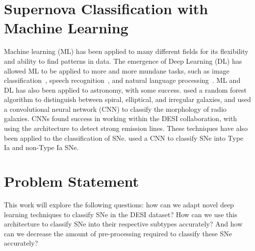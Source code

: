 \section{Supernova Classification with Machine Learning}
\label{sec:supernova-classification-with-machine-learning}
Machine learning (ML) has been applied to many different fields for its flexibility 
and ability to find patterns in data. The emergence of Deep Learning (DL) has
allowed ML to be applied to more and more mundane tasks, such as image
classification~\parencite{krizhevsky2012}, speech recognition~\parencite{Nassif2019},
and natural language processing~\parencite{Mikolov2013}. ML and DL 
has also been applied to astronomy, with some success. \textcite{Gauci2010} used 
a random forest algorithm  to distinguish between spiral, elliptical, and irregular galaxies, 
and \textcite{Becker2021} used a convolutional neural network (CNN) to classify the morphology of
radio galaxies. CNNs found success in working within the DESI collaboration, with 
\textcite{parks2018} using the architecture to detect strong emission lines.  
These techniques have also been applied to the classification of SNe. 
\textcite{Mller2016} used a CNN to classify SNe into Type Ia and non-Type Ia SNe. 

\section{Problem Statement}
This work will explore the following questions: how can we adapt novel deep learning 
techniques to classify SNe in the DESI dataset? How can we use this architecture to 
classify SNe into their respective subtypes accurately? And how can we decrease the amount of 
pre-processing required to classify these SNe accurately? 


